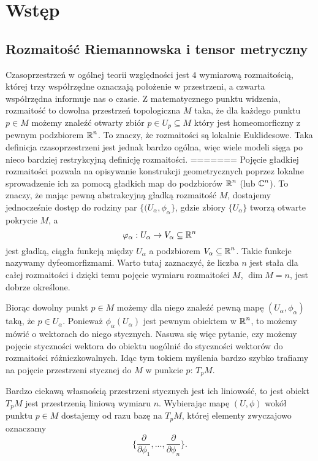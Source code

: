 \section{Wstęp}

\subsection{Rozmaitość Riemannowska i tensor metryczny}

Czasoprzestrzeń w ogólnej teorii względności jest $4$ wymiarową rozmaitością, której trzy współrzędne oznaczają położenie w przestrzeni, a czwarta współrzędna informuje nas o czasie. Z matematycznego punktu widzenia, rozmaitość to dowolna przestrzeń topologiczna $M$ taka, że dla każdego punktu $p\in M$ możemy znaleźć otwarty zbiór $p\in U_p\subseteq M$ który jest homeomorficzny z pewnym podzbiorem $\operatorname{\mathbb{R}}^n$. To znaczy, że rozmaitości są lokalnie Euklidesowe. Taka definicja czasoprzestrzeni jest jednak bardzo ogólna, więc wiele modeli sięga po nieco bardziej restrykcyjną definicję rozmaitości.
=======
Pojęcie gładkiej rozmaitości pozwala na opisywanie konstrukcji geometrycznych poprzez lokalne sprowadzenie ich za pomocą gładkich map do podzbiorów $\operatorname{\mathbb{R}}^n$ (lub $\operatorname{\mathbb{C}}^n$). To znaczy, że mając pewną abstrakcyjną gładką rozmaitość $M$, dostajemy jednocześnie dostęp do rodziny par $\{(U_\alpha,\phi_\alpha\}$, gdzie zbiory $\{U_\alpha\}$ tworzą otwarte pokrycie $M$, a 
$$\varphi_\alpha:U_\alpha\to V_\alpha\subseteq \operatorname{\mathbb{R}}^n$$
jest gładką, ciągła funkcją między $U_\alpha$ a podzbiorem $V_\alpha\subseteq\operatorname{\mathbb{R}}^n$. Takie funkcje nazywamy dyfeomorfizmami. Warto tutaj zaznaczyć, że liczba $n$ jest stała dla całej rozmaitości i dzięki temu pojęcie wymiaru rozmaitości $M$, $\dim M=n$, jest dobrze określone.

Biorąc dowolny punkt $p\in M$ możemy dla niego znaleźć pewną mapę $(U_\alpha,\phi_\alpha)$ taką, że $p\in U_\alpha$. Ponieważ $\phi_\alpha(U_\alpha)$ jest pewnym obiektem w $\operatorname{\mathbb{R}}^n$, to możemy mówić o wektorach do niego stycznych. Nasuwa się więc pytanie, czy możemy pojęcie styczności wektora do obiektu uogólnić do styczności wektorów do rozmaitości różniczkowalnych. Idąc tym tokiem myślenia bardzo szybko trafiamy na pojęcie przestrzeni stycznej do $M$ w punkcie $p$: $T_pM$. 

Bardzo ciekawą własnością przestrzeni stycznych jest ich liniowość, to jest obiekt $T_pM$ jest przestrzenią liniową wymiaru $n$. Wybierając mapę $(U, \phi)$ wokół punktu $p\in M$ dostajemy od razu bazę na $T_pM$, której elementy zwyczajowo oznaczamy
$$\{ \frac{\partial}{\partial\phi_1} , ... , \frac{\partial}{\partial\phi_n} \}.$$








